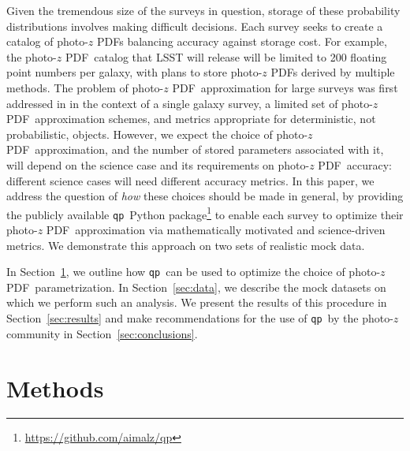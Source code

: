 \documentclass[\docopts]{\docclass}
\newcommand{\qp}{\texttt{qp}}
\newcommand{\pz}{photo-$z$ PDF}
\begin{document}
Given the tremendous size of the surveys in question, storage of these 
probability distributions involves making difficult decisions.
Each survey seeks to create a catalog of \pz s balancing accuracy against 
storage cost.
For example, the \pz\ catalog that LSST will release will be limited to 200 
floating point numbers per galaxy, with plans to store \pz s derived by 
multiple methods.  \citep{juric_data_2017}
The problem of \pz\ approximation for large surveys was first addressed in 
\citet{carrasco_kind_sparse_2014} in the context of a single galaxy survey, a 
limited set of \pz\ approximation schemes, and metrics appropriate for 
deterministic, not probabilistic, objects.
However, we expect the choice of \pz\ approximation, and the number of stored 
parameters associated with it, will depend on the science case and its 
requirements on \pz\ accuracy: different science cases will need different 
accuracy metrics.
In this paper, we address the question of \textit{how} these choices should be 
made in general, by providing the publicly available \qp\ Python 
package\footnote{\url{https://github.com/aimalz/qp}} to enable each survey to 
optimize their \pz\ approximation via mathematically motivated and 
science-driven metrics.
We demonstrate this approach on two sets of realistic mock data.

In Section~\ref{sec:methods}, we outline how \qp\ can be used to optimize the 
choice of \pz\ parametrization.
In Section~\ref{sec:data}, we describe the mock datasets on which we perform 
such an analysis.
We present the results of this procedure in Section~\ref{sec:results} and make 
recommendations for the use of \qp\ by the photo-$z$ community in 
Section~\ref{sec:conclusions}.








\section{Methods}
\label{sec:methods}
\end{document}
